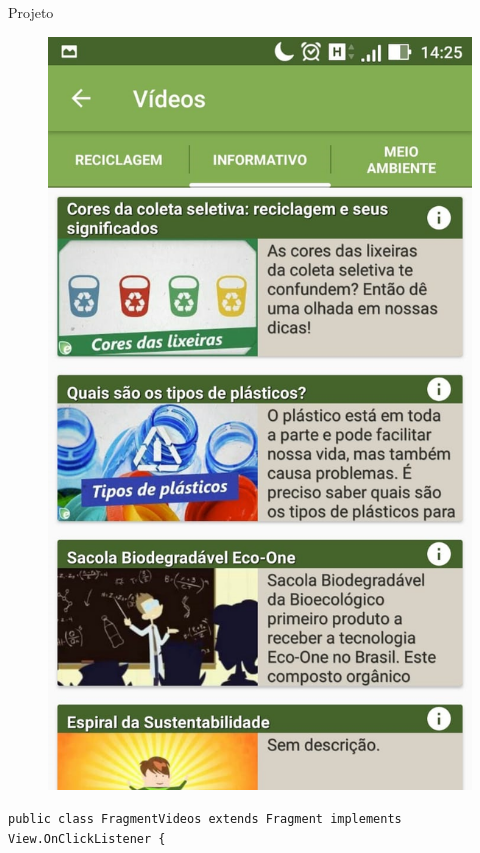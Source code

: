 \documentclass[
	12pt,				%
	openright,			%
	twoside,			%
	a4paper,			%
	english,			%
	french,				%
	spanish,			%
	brazil				%
	]{abntex2}
\begin{document}
\begin{chapter}{Projeto}
\begin{figure}[htb]
\begin{minipage}{0.45\textwidth}
    \includegraphics[scale=0.35]{media/tela_videos_2.jpg}
     \label{fig:tela_videos_2}
  \end{minipage}
\end{figure}


\begin{lstlisting}[numbers=none,basicstyle=\small,
caption={FragmentVideos.java},
title={FragmentVideos.java},
label={FragmentVideos.java}]
public class FragmentVideos extends Fragment implements View.OnClickListener {


\end{lstlisting}
\end{chapter}
\end{document}
